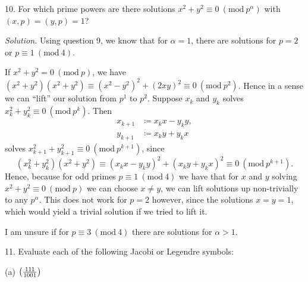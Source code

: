 \documentclass{article}
\newcommand{\Mod}[1]{\ (\mathrm{mod}\ #1)}
\newcommand{\Leg}[2]{\del{\frac{#1}{#2}}}
\begin{document}
10. For which prime powers are there solutions $x^2 + y^2 \equiv 0 \Mod{p^\alpha}$
with $(x, p) = (y, p) = 1$?

\textit{Solution.}
Using question 9, we know that for $\alpha = 1$, there are solutions for $p = 2$
or $p \equiv 1 \Mod{4}$.

If $x^2 + y^2 = 0 \Mod{p}$,
we have $(x^2 + y^2)(x^2 + y^2) \equiv (x^2 - y^2)^2 + (2xy)^2 \equiv 0 \Mod{p^2}$.
Hence in a sense we can ``lift'' our solution from $p^1$ to $p^2$. Suppose
$x_k$ and $y_k$ solves $x_k^2 + y_k^2 \equiv 0 \Mod{p^k}$. Then
%
\begin{align*}
    x_{k + 1} &\coloneqq x_k x - y_k y, \\
    y_{k + 1} &\coloneqq x_k y + y_k x
\end{align*}
%
solves $x_{k + 1}^2 + y_{k + 1}^2 \equiv 0 \Mod{p^{k + 1}}$, since
%
\begin{equation*}
    (x_k^2 + y_k^2) (x^2 + y^2) \equiv (x_kx - y_k y)^2 + (x_k y + y_k x)^2 \equiv 0 \Mod{p^{k + 1}}
    .
\end{equation*}
%
Hence, because for odd primes $p \equiv 1 \Mod{4}$ we have that for $x$ and $y$ solving
$x^2 + y^2 \equiv 0 \Mod{p}$ we can choose $x \neq y$, we can lift solutions up
non-trivially to any $p^\alpha$. This does not work for $p = 2$ however,
since the solutions $x = y = 1$, which would yield a trivial solution if we tried
to lift it.

I am unsure if for $p \equiv 3 \Mod{4}$ there are solutions for $\alpha > 1$.

\newpage

11. Evaluate each of the following Jacobi or Legendre symbols:

(a) $\Leg{111}{1001}$
\end{document}
